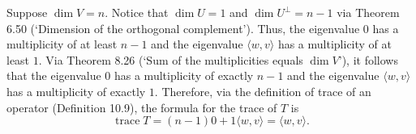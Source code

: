 \documentclass{article}
\begin{document}
Suppose $\operatorname{dim}V=n$. 
Notice that $\operatorname{dim}U=1$ and $\operatorname{dim}U^\bot=n-1$ via Theorem 6.50 (`Dimension of the orthogonal complement'). 
Thus, the eigenvalue $0$ has a multiplicity of at least $n-1$ and the eigenvalue $\langle w,v\rangle$ has a multiplicity of at least $1$. 
Via Theorem 8.26 (`Sum of the multiplicities equals $\operatorname{dim}V$'), it follows that the eigenvalue $0$ has a multiplicity of exactly $n-1$ and the eigenvalue $\langle w,v\rangle$ has a multiplicity of exactly $1$. Therefore, via the definition of trace of an operator (Definition 10.9), the formula for the trace of $T$ is
\[\operatorname{trace}T=(n-1)0 + 1\langle w,v\rangle=\langle w,v\rangle.\]
\end{document}
